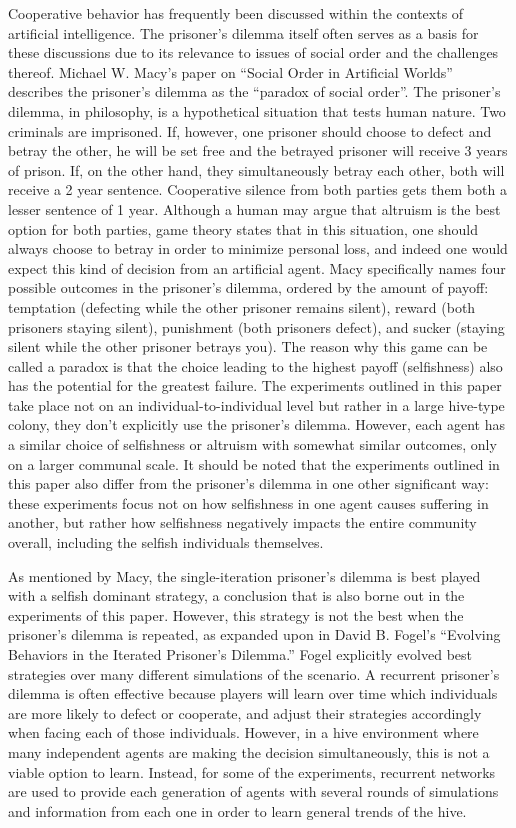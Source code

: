 \documentclass[11pt, letter]{article}
\begin{document}
		Cooperative behavior has frequently been discussed within the contexts of artificial intelligence. The prisoner's dilemma itself often serves as a basis for these discussions due to its relevance to issues of social order and the challenges thereof. Michael W. Macy's paper on ``Social Order in Artificial Worlds'' describes the prisoner's dilemma as the ``paradox of social order''. \cite{macy} The prisoner’s dilemma, in philosophy, is a hypothetical situation that tests human nature. Two criminals are imprisoned. If, however, one prisoner should choose to defect and betray the other, he will be set free and the betrayed prisoner will receive 3 years of prison. If, on the other hand, they simultaneously betray each other, both will receive a 2 year sentence. Cooperative silence from both parties gets them both a lesser sentence of 1 year. Although a human may argue that altruism is the best option for both parties, game theory states that in this situation, one should always choose to betray in order to minimize personal loss, and indeed one would expect this kind of decision from an artificial agent. Macy specifically names four possible outcomes in the prisoner's dilemma, ordered by the amount of payoff: temptation (defecting while the other prisoner remains silent), reward (both prisoners staying silent), punishment (both prisoners defect), and sucker (staying silent while the other prisoner betrays you). The reason why this game can be called a paradox is that the choice leading to the highest payoff (selfishness) also has the potential for the greatest failure. The experiments outlined in this paper take place not on an individual-to-individual level but rather in a large hive-type colony, they don't explicitly use the prisoner's dilemma. However, each agent has a similar choice of selfishness or altruism with somewhat similar outcomes, only on a larger communal scale. It should be noted that the experiments outlined in this paper also differ from the prisoner's dilemma in one other significant way: these experiments focus not on how selfishness in one agent causes suffering in another, but rather how selfishness negatively impacts the entire community overall, including the selfish individuals themselves.


		As mentioned by Macy, the single-iteration prisoner's dilemma is best played with a selfish dominant strategy, a conclusion that is also borne out in the experiments of this paper. However, this strategy is not the best when the prisoner's dilemma is repeated, as expanded upon in David B. Fogel's ``Evolving Behaviors in the Iterated Prisoner's Dilemma.'' \cite{fogel}  Fogel explicitly evolved best strategies over many different simulations of the scenario. A recurrent prisoner's dilemma is often effective because players will learn over time which individuals are more likely to defect or cooperate, and adjust their strategies accordingly when facing each of those individuals. However, in a hive environment where many independent agents are making the decision simultaneously, this is not a viable option to learn. Instead, for some of the experiments, recurrent networks are used to provide each generation of agents with several rounds of simulations and information from each one in order to learn general trends of the hive.
\end{document}
